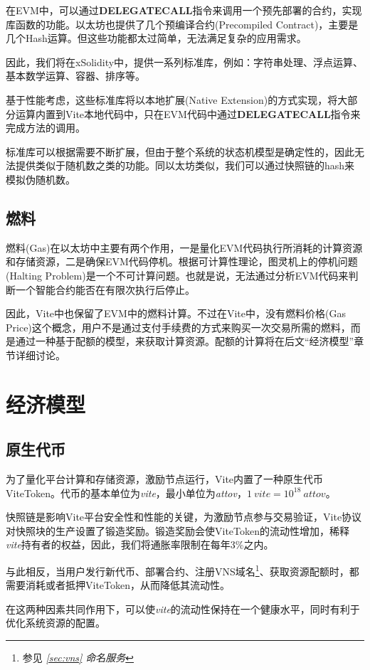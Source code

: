 \documentclass[UTF8,nofonts]{ctexart}
\begin{document}
\begin{multicols}{2}
在EVM中，可以通过\textbf{DELEGATECALL}指令来调用一个预先部署的合约，实现库函数的功能。以太坊也提供了几个预编译合约(Precompiled Contract)，主要是几个Hash运算。但这些功能都太过简单，无法满足复杂的应用需求。

因此，我们将在xSolidity中，提供一系列标准库，例如：字符串处理、浮点运算、基本数学运算、容器、排序等。

基于性能考虑，这些标准库将以本地扩展(Native Extension)的方式实现，将大部分运算内置到Vite本地代码中，只在EVM代码中通过\textbf{DELEGATECALL}指令来完成方法的调用。

标准库可以根据需要不断扩展，但由于整个系统的状态机模型是确定性的，因此无法提供类似于随机数之类的功能。同以太坊类似，我们可以通过快照链的hash来模拟伪随机数。

\subsection{燃料}
燃料(Gas)在以太坊中主要有两个作用，一是量化EVM代码执行所消耗的计算资源和存储资源，二是确保EVM代码停机。根据可计算性理论，图灵机上的停机问题(Halting Problem)是一个不可计算问题\cite{haltingproblems}。也就是说，无法通过分析EVM代码来判断一个智能合约能否在有限次执行后停止。

因此，Vite中也保留了EVM中的燃料计算。不过在Vite中，没有燃料价格(Gas Price)这个概念，用户不是通过支付手续费的方式来购买一次交易所需的燃料，而是通过一种基于配额的模型，来获取计算资源。配额的计算将在后文“经济模型”章节详细讨论。

\section{经济模型}
\subsection{原生代币}
为了量化平台计算和存储资源，激励节点运行，Vite内置了一种原生代币ViteToken。代币的基本单位为\textit{vite}，最小单位为\textit{attov}，$1 \: vite = 10^{18} \: attov$。

快照链是影响Vite平台安全性和性能的关键，为激励节点参与交易验证，Vite协议对快照块的生产设置了锻造奖励。锻造奖励会使ViteToken的流动性增加，稀释\textit{vite}持有者的权益，因此，我们将通胀率限制在每年3\%之内。

与此相反，当用户发行新代币、部署合约、注册VNS域名\footnote{参见  \textit{\ref{sec:vns} 命名服务}}、获取资源配额时，都需要消耗或者抵押ViteToken，从而降低其流动性。

在这两种因素共同作用下，可以使\textit{vite}的流动性保持在一个健康水平，同时有利于优化系统资源的配置。


\end{multicols}
\end{document}
